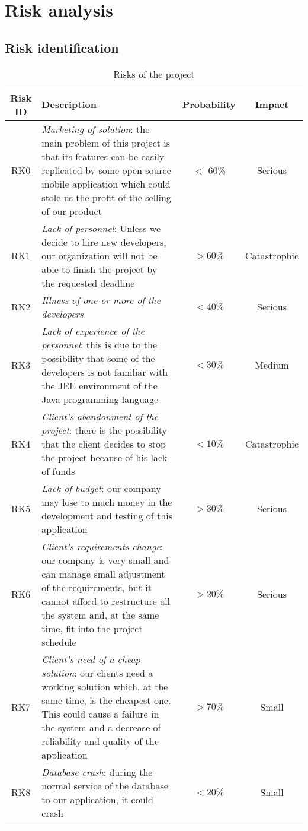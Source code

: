 \chapter{Risk analysis}
\section{Risk identification}

\begin{longtable}{c | p{} | c | c}
\textbf{Risk ID} & \textbf{Description} & \textbf{Probability} & \textbf{Impact} \\ \hline
RK0 & \textit{Marketing of solution}: the main problem of this project is that its features can be easily replicated by some open source mobile application which could stole us the profit of the selling of our product & $<$ 60\% & Serious \\ \hline
RK1 & \textit{Lack of personnel}: Unless we decide to hire new developers, our organization will not be able to finish the project by the requested deadline & $>60 \%$ & Catastrophic \\ \hline
RK2 & \textit{Illness of one or more of the developers} & $< 40 \%$ & Serious \\ \hline
RK3 & \textit{Lack of experience of the personnel}: this is due to the possibility that some of the developers is not familiar with the JEE environment of the Java programming language & $<30\%$ & Medium \\ \hline
RK4 & \textit{Client's abandonment of the project}: there is the possibility that the client decides to stop the project because of his lack of funds & $<10 \%$ & Catastrophic \\ \hline
RK5 & \textit{Lack of budget}: our company may lose to much money in the development and testing of this application & $>30 \%$ & Serious \\ \hline
RK6 & \textit{Client's requirements change}: our company is very small and can manage small adjustment of the requirements, but it cannot afford to restructure all the system and, at the same time, fit into the project schedule & $>20\%$ & Serious \\ \hline
RK7 & \textit{Client's need of a cheap solution}: our clients need a working solution which, at the same time, is the cheapest one. This could cause a failure in the system and a decrease of reliability and quality of the application & $>70\%$ & Small \\ \hline
RK8 & \textit{Database crash}: during the normal service of the database to our application, it could crash & $<20\%$ & Small\\
\caption{Risks of the project}
\end{longtable}

